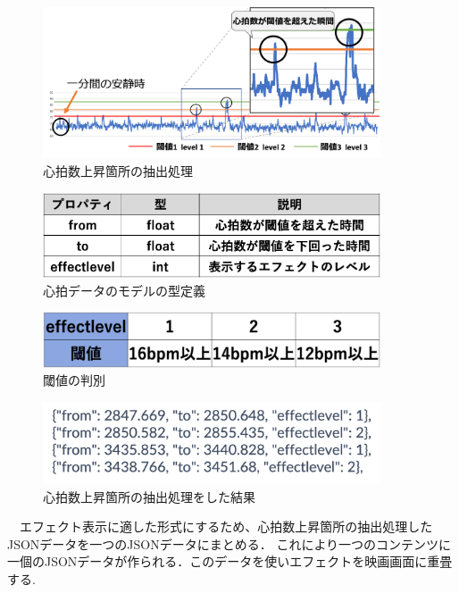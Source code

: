 \begin{figure}[H]
    \centering
    \includegraphics[width=10cm]{images/chapter3/haisyutusyori.png}
    \caption{心拍数上昇箇所の抽出処理}
\end{figure}

\begin{figure}[H]
    \centering
    \includegraphics[width=10cm]{images/chapter3/propaty.png}
    \caption{心拍データのモデルの型定義}
\end{figure}

\begin{figure}[H]
    \centering
    \includegraphics[width=10cm]{images/chapter3/effectlevel.png}
    \caption{閾値の判別}
\end{figure}


\begin{figure}[H]
    \centering
    \includegraphics[width=10cm]{images/chapter3/level.png}
    \caption{心拍数上昇箇所の抽出処理をした結果}
\end{figure}


　エフェクト表示に適した形式にするため、心拍数上昇箇所の抽出処理したJSONデータを一つのJSONデータにまとめる．
これにより一つのコンテンツに一個のJSONデータが作られる．このデータを使いエフェクトを映画画面に重畳する.

